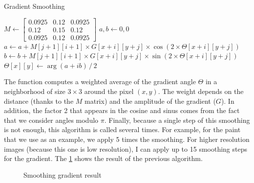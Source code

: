 \documentclass[11pt]{article}
\begin{document}
	\begin{algorithm}[h]
		\caption{Gradient Smoothing}
		\label{alg:gsmooth}
		\begin{algorithmic}
			\State $M \gets \begin{bmatrix}
				0.0925 & 0.12 & 0.0925 \\
				0.12 & 0.15 & 0.12 \\
				0.0925 & 0.12 & 0.0925
			\end{bmatrix}$
			\State $a, b \gets 0, 0$
				\State $a \gets a + M[j+1][i+1] \times G[x+i][y+j] \times \cos \left( 2 \times \Theta[x+i][y+j] \right)$
				\State $b \gets b + M[j+1][i+1] \times G[x+i][y+j] \times \sin \left( 2 \times \Theta[x+i][y+j] \right)$
			\EndFor
			\State $\Theta[x][y] \gets \arg \left( a + ib \right) \, / \, 2$
			\EndFunction
		\end{algorithmic}
	\end{algorithm}

	The function computes a weighted average of the gradient angle $\Theta$ in a neighborhood of size $3 \times 3$ around the pixel $(x, y)$. The weight depends on the distance (thanks to the $M$ matrix) and the amplitude of the gradient ($G$). In addition, the factor 2 that appears in the cosine and sinus comes from the fact that we consider angles modulo $\pi$. Finally, because a single step of this smoothing is not enough, this algorithm is called several times. For example, for the paint that we use as an example, we apply 5 times the smoothing. For higher resolution images (because this one is low resolution), I can apply up to 15 smoothing steps for the gradient. The \figurename \ref{im:gsmooth} shows the result of the previous algorithm.
	
	\begin{figure}[h]
		\centering
		\vspace{-1mm}
		\caption{Smoothing gradient result}
		\label{im:gsmooth}
	\end{figure}
\end{document}
